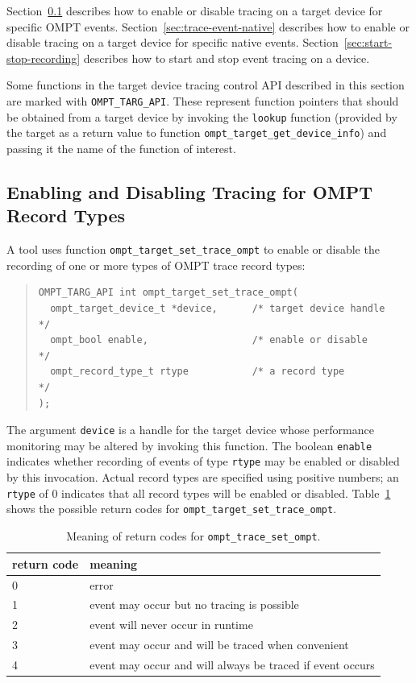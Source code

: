 \documentclass{article}
\begin{document}
 Section~\ref{sec:trace-event}  describes how to enable or disable tracing on a target device for specific OMPT events. 
  Section~\ref{sec:trace-event-native}  describes how to enable or disable tracing on a target device for specific native events. Section~\ref{sec:start-stop-recording} describes how to start and stop event tracing on a device. 
  
Some functions in the target device tracing control API described in this section are marked with \verb|OMPT_TARG_API|. These represent function pointers that should be obtained from a target device by invoking the \verb|lookup| function (provided by the target  as a return value to function \verb|ompt_target_get_device_info|) and passing it the name of the function of interest.


\subsection{Enabling and Disabling Tracing for OMPT Record Types}
\label{sec:trace-event}
A tool uses function \verb|ompt_target_set_trace_ompt| to enable or disable the recording of one or more types of OMPT trace record types:

\begin{quote}
\begin{verbatim}
OMPT_TARG_API int ompt_target_set_trace_ompt(
  ompt_target_device_t *device,      /* target device handle      */
  ompt_bool enable,                  /* enable or disable         */
  ompt_record_type_t rtype           /* a record type             */
);
\end{verbatim}
\end{quote}
The argument \verb|device| is a handle for the target device whose performance monitoring may be altered by invoking this function. 
The boolean \verb|enable| indicates whether recording of events of type \verb|rtype| may be enabled or disabled by this invocation.
Actual record types are specified using positive numbers; an \verb|rtype| of 0 indicates that all record types will be enabled or disabled.
Table~\ref{table:record_set} shows the possible return codes for \verb|ompt_target_set_trace_ompt|.
\begin{table}
\centering
\begin{tabular}{|l|l|}
\hline
return code & meaning \\\hline
0 & error\\\hline
1 & event may occur but no tracing is possible\\\hline
2 & event will never occur in runtime\\\hline
3 & event may occur and will be traced  when convenient\\\hline
4 & event may occur and will always be traced if event occurs\\\hline
\end{tabular}
\caption{Meaning of return codes for {\tt ompt\_trace\_set\_ompt}.}
\label{table:record_set}
\end{table}
\end{document}
